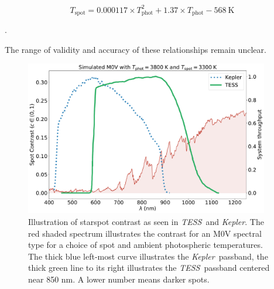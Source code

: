 \documentclass[twocolumn]{aastex631}
\newcommand{\tess}{{\it TESS}}
\newcommand{\kepler}{{\it Kepler}}
\begin{document}
\begin{equation}
  T_{\mathrm{spot}} = 0.000117 \times T_{\mathrm{phot}}^2 + 1.37 \times T_{\mathrm{phot}} - 568 ~\mathrm{K}
  \label{eq:TspotFang}
\end{equation}

.


The range of validity and accuracy of these relationships remain unclear.




\begin{figure}[hbt!]
  \includegraphics[width=0.95\textwidth]{figures/contrast_spectrum2.pdf}
  \caption{Illustration of starspot contrast as seen in \tess\ and \kepler. The red shaded spectrum illustrates the contrast for an M0V spectral type for a choice of spot and ambient photospheric temperatures. The thick blue left-most curve illustrates the \kepler\ passband, the thick green line to its right illustrates the \tess\ passband centered near 850 nm.  A lower number means darker spots.  }
  \label{fig:filtercurve}
\end{figure}
\end{document}
